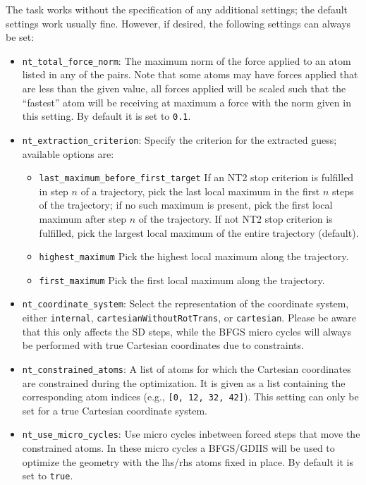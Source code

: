 \documentclass[]{tufte-book}
\begin{document}
The task works without the specification of any additional settings; the default settings work usually fine. However,
if desired, the following settings can always be set:
\begin{itemize}
\item \texttt{nt\_total\_force\_norm}: The maximum norm of the force applied to an atom listed in any of the pairs.
 Note that some atoms may have forces applied that are less than the given value, all forces applied will be scaled
 such that the ``fastest'' atom will be receiving at maximum a force with the norm given in this setting.
 By default it is set to \texttt{0.1}.
\item \texttt{nt\_extraction\_criterion}: Specify the criterion for the extracted guess; available options are:
\begin{itemize}
  \item \texttt{last\_maximum\_before\_first\_target} If an NT2 stop criterion is fulfilled in step $n$ of a trajectory, pick the last local maximum in the first $n$ steps of the trajectory; if no such maximum is present, pick the first local maximum after step $n$ of the trajectory. If not NT2 stop criterion is fulfilled, pick the largest local maximum of the entire trajectory (default).
  \item \texttt{highest\_maximum} Pick the highest local maximum along the trajectory.
  \item \texttt{first\_maximum} Pick the first local maximum along the trajectory.
\end{itemize}
\item \texttt{nt\_coordinate\_system}: Select the representation of the coordinate system, either
 \texttt{internal}\cite{libirc}, \texttt{cartesianWithoutRotTrans}, or \texttt{cartesian}.
Please be aware that this only affects the SD steps, while the BFGS micro cycles will always be performed with true
 Cartesian coordinates due to constraints.
\item \texttt{nt\_constrained\_atoms}: A list of atoms for which the Cartesian coordinates are constrained during the optimization.
  It is given as a list containing the corresponding atom indices (e.g., \texttt{[0, 12, 32, 42]}). This setting can only be set for a true Cartesian coordinate system.
\item \texttt{nt\_use\_micro\_cycles}: Use micro cycles inbetween forced steps that move the constrained atoms.
In these micro cycles a BFGS/GDIIS will be used to optimize the geometry with the lhs/rhs atoms fixed in place.
By default it is set to \texttt{true}.

\end{itemize}
\end{document}
